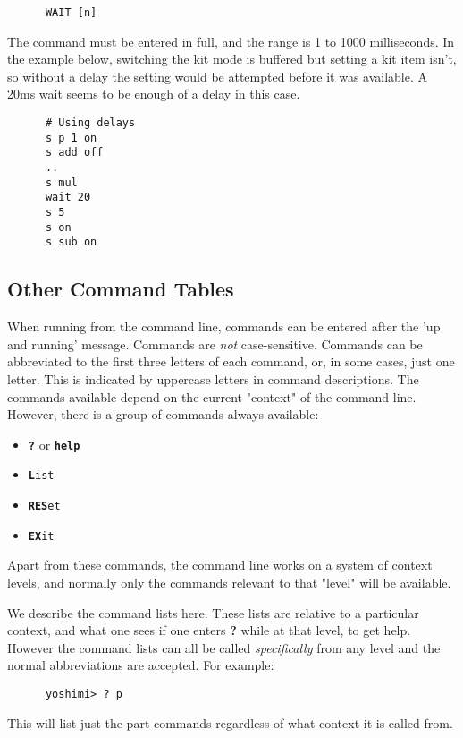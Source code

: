    \begin{verbatim}
      WAIT [n]
   \end{verbatim}

   The command must be entered in full, and the range is 1 to 1000 milliseconds.
   In the example below, switching the kit mode is buffered but setting a kit
   item isn't, so without a delay the setting would be attempted before it was
   available. A 20ms wait seems to be enough of a delay in this case.
   \begin{verbatim}
      # Using delays
      s p 1 on
      s add off
      ..
      s mul
      wait 20
      s 5
      s on
      s sub on
   \end{verbatim}

\subsection{Other Command Tables}
\label{subsec:command_line_other_command_tables}

   When running from the command line, commands can be entered after the
   'up and running' message. Commands are \textsl{not} case-sensitive.
   Commands can be abbreviated to the first three letters of each command,
   or, in some cases, just one letter.  This is indicated by
   uppercase letters in command descriptions.
   The commands available depend on the current "context" of the command line.
   However, there is a group of commands always available:

   \begin{itemize}
      \item \texttt{\textbf{?}} or \texttt{\textbf{help}}
      \item \texttt{\textbf{L}ist}
      \item \texttt{\textbf{RES}et}
      \item \texttt{\textbf{EX}it}
   \end{itemize}

   Apart from these commands, the command line works on a system of
   context levels, and normally only the commands relevant to that "level"
   will be available.

   We describe the command lists here. These lists are relative to
   a particular context, and what one sees if one enters
   \textbf{?} while at that level, to get help.
   However the command lists can all be called \textsl{specifically} from any
   level and the normal abbreviations are accepted. For example:
   \begin{verbatim}
      yoshimi> ? p
   \end{verbatim}
   This will list just the part commands regardless of what context it is
   called from.


